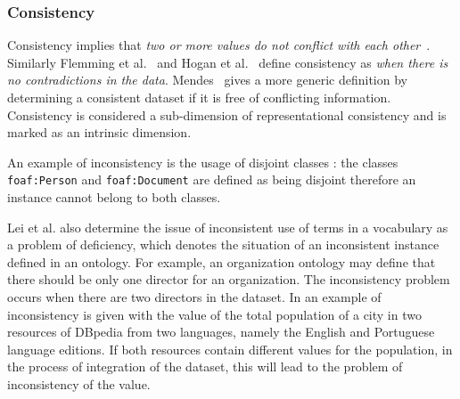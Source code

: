 \subsubsection{Consistency} 
Consistency implies that \emph{two or more values do not conflict with each other}~\cite{Bizerthesis}. 
Similarly Flemming et al.~\cite{Flemming} and Hogan et al.~\cite{Hogan} define consistency as \emph{when there is no contradictions in the data}. 
Mendes~\cite{Mendes} gives a more generic definition by determining a consistent dataset if it is free of conflicting information.
Consistency is considered a sub-dimension of representational consistency and is marked as an intrinsic dimension. 

An example of inconsistency is the usage of disjoint classes \cite{Hogan}: the classes \texttt{foaf:Person} and \texttt{foaf:Document} are defined as being disjoint therefore an instance cannot belong to both classes. 

Lei et al. \cite{Lei} also determine the issue of inconsistent use of terms in a vocabulary as a problem of deficiency, which denotes the situation of an inconsistent instance defined in an ontology. 
For example, an organization ontology may define that there should be only one director for an organization. 
The inconsistency problem occurs when there are two directors in the dataset.
In \cite{Mendes} an example of inconsistency is given with the value of the total population of a city in two resources of DBpedia from two languages, namely the English and Portuguese language editions. 
If both resources contain different values for the population, in the process of integration of the dataset, this will lead to the problem of inconsistency of the value. 

